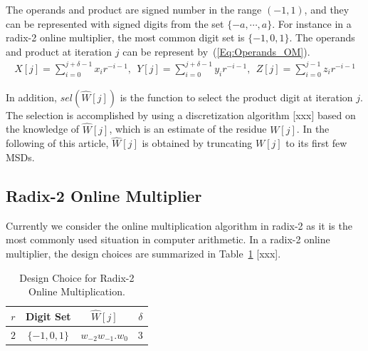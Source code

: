 \documentclass[a4paper, 11pt]{article}
\begin{document}
 The operands and product are signed number in the range $(-1,1)$, and they can be represented with signed digits from the set $\{-a,\cdots,a\}$. For instance in a radix-2 online multiplier, the most common digit set is $\{-1,0,1\}$. The operands and product at iteration $j$ can be represent by~(\ref{Eq:Operands_OM}).
\begin{eqnarray}\label{Eq:Operands_OM}
  X[j]=\sum_{i=0}^{j+\delta-1}x_ir^{-i-1},~~Y[j]=\sum_{i=0}^{j+\delta-1}y_ir^{-i-1},~~Z[j]=\sum_{i=0}^{j-1}z_ir^{-i-1}
\end{eqnarray}

In addition, $sel(\widehat{W}[j])$ is the function to select the product digit at iteration $j$. The selection is accomplished by using a discretization algorithm [xxx] based on the knowledge of $\widehat{W}[j]$, which is an estimate of the residue $W[j]$. In the following of this article, $\widehat{W}[j]$ is obtained by truncating $W[j]$ to its first few MSDs.




\subsection{Radix-2 Online Multiplier}
Currently we consider the online multiplication algorithm in radix-2 as it is the most commonly used situation in computer arithmetic. In a radix-2 online multiplier, the design choices are summarized in Table~\ref{Tab:Radix2_OM_Parameter} [xxx]. 
%
\begin{table}[htbp]
\caption{Design Choice for Radix-2 Online Multiplication.}
\centering
\begin{tabular}{c|c|c|c}
 \hline
 \hline
 $r$ & Digit Set & $\widehat{W}[j]$  & $\delta$ \\ 
 \hline
 $2$ & $\{-1,0,1\}$ & $w_{-2}w_{-1}.w_{0}$ & $3$\\
 \hline
 \hline 
\end{tabular}
\label{Tab:Radix2_OM_Parameter}
\end{table}
\end{document}
